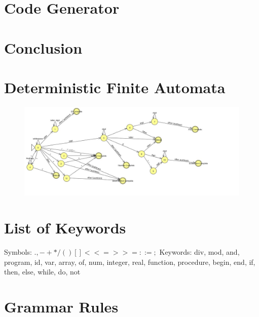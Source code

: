 \documentclass[10]{amsart}
\begin{document}
\section{Code Generator}

\section{Conclusion}


\newpage
\begin{appendices}
\section{Deterministic Finite Automata}
\label{DFA}
\begin{figure}[!ht]
	\includegraphics[width=\textwidth]{ScannerDFA.jpg}
\end{figure}


\section{List of Keywords}
\label{keywords}
Symbols: $ . , - + * / ( ) { } [ ] { } < <= > >= : := ;$  
\newline
Keywords: div, mod, and, program, id, var, array, of, num, integer, real, function, procedure, begin, end, if, then, else, while, do, not

\section{Grammar Rules}
\label{grammars}



\end{appendices}
\end{document}
